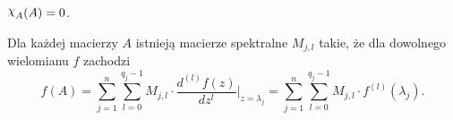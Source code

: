 
\begin{theorem}
  $\goodchi_A(A) = 0$.
\end{theorem}

\begin{theorem}
  Dla każdej macierzy $A$ istnieją macierze spektralne $M_{j,l}$ takie, że dla dowolnego
  wielomianu $f$ zachodzi
  \[
    f(A) = \sum_{j=1}^{n} \sum_{l=0}^{q_j - 1} M_{j,l} \cdot
    \frac{d^{(l)} f(z)}{dz^l} \bigg\vert_{z = \lambda_j} =
    \sum_{j=1}^{n} \sum_{l=0}^{q_j - 1} M_{j,l} \cdot f^{(l)}(\lambda_j).
  \]
\end{theorem}





















